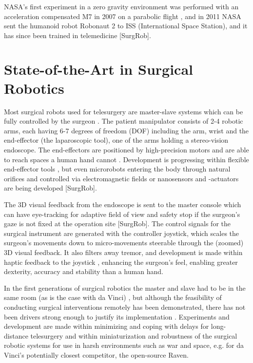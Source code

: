 NASA's first experiment in a zero gravity environment was performed with an acceleration compensated M7 in 2007 on a parabolic flight \citep[pp 29, 76, 85]{bib:surgical_book}, and in 2011 NASA sent the humanoid robot Robonaut 2 to ISS (International Space Station), and it has since been trained in telemedicine [SurgRob].







\section{State-of-the-Art in Surgical Robotics}
Most surgical robots used for telesurgery are master-slave systems which can be fully controlled by the surgeon \citep{bib:raven_debride}. The patient manipulator consists of 2-4 robotic arms, each having 6-7 degrees of freedom (DOF) \citep{bib:raven_debride} including the arm, wrist and the end-effector (the laparoscopic tool), one of the arms holding a stereo-vision endoscope. The end-effectors are positioned by high-precision motors and are able to reach spaces a human hand cannot \citep{bib:docatadist}.
Development is progressing within flexible end-effector tools \citep[p 74]{bib:surgical_book}, but even microrobots entering the body through natural orifices and controlled via electromagnetic fields or nanosensors and -actuators are being developed [SurgRob].

The 3D visual feedback from the endoscope is sent to the master console which can have eye-tracking for adaptive field of view and safety stop if the surgeon's gaze is not fixed at the operation site [SurgRob]. The control signals for the surgical instrument are generated with the controller joystick, which scales the surgeon's movements down to micro-movements \citep{bib:intuitive_monopoly} steerable through the (zoomed) 3D visual feedback. It also filters away tremor, and development is made within haptic feedback to the joystick \citep[p 89]{bib:surgical_book}, enhancing the surgeon's feel, enabling greater dexterity, accuracy and stability than a human hand.

In the first generations of surgical robotics the master and slave had to be in the same room (as is the case with da Vinci) \citep{bib:telesurg_history,bib:raven_debride,bib:surgical_book}, but although the feasibility of conducting surgical interventions remotely has been demonstrated, there has not been drivers strong enough to justify its implementation \citep[p 38]{bib:surgical_book}. Experiments and development are made within minimizing and coping with delays for long-distance telesurgery and within miniaturization and robustness of the surgical robotic systems for use in harsh environments such as war and space, e.g. for da Vinci's potentially closest competitor, the open-source Raven.

